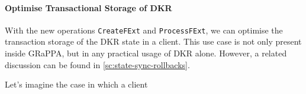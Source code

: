 \paragraph{Optimise Transactional Storage of DKR}

With the new operations \texttt{CreateFExt} and \texttt{ProcessFExt},
we can optimise the transaction storage of the DKR state in a client.
This use case is not only present inside GRaPPA, but in any practical
usage of DKR alone. However, a related discussion can be found in \cref{sc:state-sync-rollbacks}.

Let's imagine the case in which a client 
